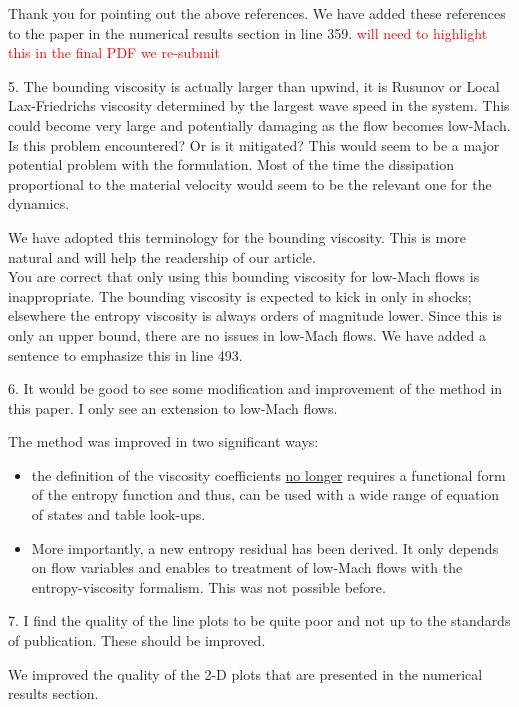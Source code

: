 \documentclass{article}
\newcommand{\tcr}[1]{\textcolor{red}{#1}}
\begin{document}
Thank you for pointing out the above references. We have added these references to the paper in the numerical results section in line 359. \tcr{will need to highlight this in the final PDF we re-submit}
\bigskip


{
\color{blue}
5. The bounding viscosity is actually larger than upwind, it is Rusunov or
Local Lax-Friedrichs viscosity determined by the largest wave speed in the
system. This could become very large and potentially damaging as the
flow becomes low-Mach. Is this problem encountered? Or is it mitigated?
This would seem to be a major potential problem with the formulation.
Most of the time the dissipation proportional to the material velocity
would seem to be the relevant one for the dynamics.
}

We have adopted this terminology for the bounding viscosity. This is more natural and
will help the readership of our article. \\
You are correct that only using this bounding viscosity for low-Mach flows is inappropriate.  
The bounding viscosity is expected to kick in only in shocks; elsewhere the entropy viscosity is always orders of magnitude lower. Since this is only an upper bound, there are no issues in low-Mach flows. We have added a sentence to emphasize this in line 493.
\bigskip


{
\color{blue}
6. It would be good to see some modification and improvement of the
method in this paper. I only see an extension to low-Mach flows.
}

The method was improved in two significant ways: 
\begin{itemize}
\item the definition of the viscosity coefficients \underline{no longer} requires a functional form of the entropy function and thus, can be used with a wide range of equation of states and table look-ups. 
\item More importantly, a new entropy residual has been derived. It only depends on flow variables and enables to treatment of low-Mach flows with the entropy-viscosity formalism. This was not possible before.
\end{itemize}
\bigskip


{
\color{blue}
7. I find the quality of the line plots to be quite poor and not up to the
standards of publication. These should be improved.
}

We improved the quality of the 2-D plots that are presented in the numerical results section. 
\bigskip
\end{document}
